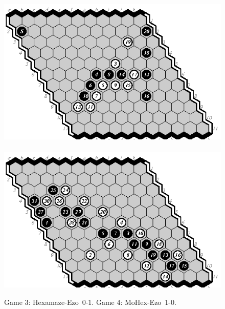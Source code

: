 \documentclass{icga}
\def\Eo{\mbox{\sc Ezo}}
\def\Hz{\mbox{\sc Hexamaze}}
\def\Mx{\mbox{\sc MoHex}}
\begin{document}
\begin{figure}[hbp]
\includegraphics[scale=1.3]{games/hexdiag/03-he-swap-0-1.eps}\hspace*{-1cm}\
\includegraphics[scale=1.3]{games/hexdiag/04-me-1-0.eps}
\caption{Game 3: \Hz-\Eo\ 0-1. Game 4: \Mx-\Eo\ 1-0.}
\end{figure}
\end{document}
